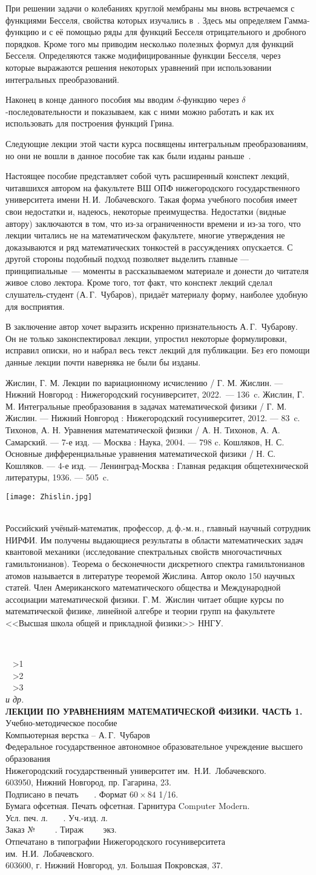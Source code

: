 \documentclass[10pt,a5paper,openany]{book}
\theoremstyle{definition}
\newcommand{\aboutauthor}{\newpage
	\thispagestyle{empty}
	\noindent\parbox{0.29\textwidth}{\texttt{[image: Zhislin.jpg]}}\parbox{0.69\textwidth}{\MakeUppercase{\athFA~\athNA}\\ \footnotesize Российский учёный-математик, профессор, д.\,ф.-м.\,н., главный научный сотрудник НИРФИ. Им получены выдающиеся результаты в области математических задач квантовой механики (исследование спектральных свойств многочастичных гамильтонианов). Теорема о бесконечности дискретного спектра гамильтонианов атомов называется в литературе теоремой Жислина. Автор около 150 научных статей. Член Американского математического общества и Международной ассоциации математической физики. Г.\,М.~Жислин читает общие курсы по математической физике, линейной алгебре и теории групп на факультете <<Высшая школа общей и прикладной физики>> ННГУ.}}
\newcommand{\lastpage}{
	\clearpage
	\thispagestyle{empty}
	~
	\vfill
	\begin{center}
		\athNA~\textbf{\athFA}
		\ifnum\numAuths>1\\\athNB~\textbf{\athFB}\fi
		\ifnum\numAuths>2\\\athNC~\textbf{\athFC}\fi
		\ifnum\numAuths>3\\\textit{и др.}\fi
		\\[12pt]
		\textbf{\MakeUppercase{\setTitle}.}\\[12pt]
		\setKind \\[24pt]
		Компьютерная верстка -- А.\,Г.~Чубаров\\[12pt]
		Федеральное государственное автономное образовательное учреждение высшего образования\\
		Нижегородский государственный университет им.~Н.И.~Лобачевского.\\
		603950, Нижний Новгород, пр. Гагарина, 23.\\[12pt]		
		Подписано в печать \ \ \ . Формат $60\times84$ 1/16.\\
		Бумага офсетная. Печать офсетная. Гарнитура Computer Modern.\\
		Усл. печ. л. \ \ \ . Уч.-изд. л.\\
		Заказ № \ \ \ \ . Тираж \ \ \ \ экз.\\[12pt]
		Отпечатано в типографии Нижегородского госуниверситета
		им.~Н.И.~Лобачевского.\\
		603600, г. Нижний Новгород, ул. Большая Покровская, 37.
	\end{center}
}
\newcommand{\setTitle}{Лекции по уравнениям математической физики. Часть 1}
\newcommand{\numAuths}{1}
\newcommand{\setKind}{Учебно-методическое пособие}
\begin{document}
	При решении задачи о колебаниях круглой мембраны мы вновь встречаемся с функциями Бесселя, свойства которых изучались в~\cite{VI}. Здесь мы определяем Гамма-функцию и с её помощью ряды для функций Бесселя отрицательного и дробного порядков. Кроме того мы приводим несколько полезных формул для функций Бесселя. Определяются также модифицированные функции Бесселя, через которые выражаются решения некоторых уравнений при использовании интегральных преобразований.  
	
	Наконец в конце данного пособия мы вводим $\delta$-функцию через $\delta$-по\-следовательности и показываем, как с ними можно работать и как их использовать для построения функций Грина.
	
	Следующие лекции этой части курса посвящены интегральным преобразованиям, но они не вошли в данное пособие так как были изданы раньше~\cite{IP}.
	
	Настоящее пособие представляет собой чуть расширенный конспект лекций, читавшихся автором на факультете ВШ ОПФ нижегородского государственного университета имени Н.\,И.~Лобачевского. Такая форма учебного пособия имеет свои недостатки и, надеюсь, некоторые преимущества. Недостатки (видные автору) заключаются в том, что из-за ограниченности времени и из-за того, что лекции читались не на математическом факультете, многие утверждения не доказываются и ряд математических тонкостей в рассуждениях опускается. С другой стороны подобный подход позволяет выделить главные --- принципиальные~--- моменты в рассказываемом материале и донести до читателя живое слово лектора. Кроме того, тот факт, что конспект лекций сделал слушатель-студент (А.\,Г.~Чубаров), придаёт материалу форму, наиболее удобную для восприятия.
	
	В заключение автор хочет выразить искренно признательность А.\,Г.~Чубарову. Он не только законспектировал лекции, упростил некоторые формулировки, исправил описки, но и набрал весь текст лекций для публикации. Без его помощи данные лекции почти наверняка не были бы изданы.

	
	
	
	
	
	
	
	
	
	

\begin{thebibliography}{99}
	\label{bibliography}

	 Жислин, Г. М. Лекции по вариационному исчислению / Г. М. Жислин. --- Нижний Новгород : Нижегородский госуниверситет, 2022.~--- 136~c. 
	 Жислин, Г. М. Интегральные преобразования в задачах математической физики / Г. М. Жислин. --- Нижний Новгород : Нижегородский госуниверситет, 2012. --- 83~c.
	 Тихонов, А. Н. Уравнения математической физики / А. Н. Тихонов, А. А. Самарский. --- 7-е изд. --- Москва : Наука, 2004. --- 798 c.
	Кошляков, Н. С. Основные дифференциальные уравнения математической физики / Н. С. Кошляков. --- 4-е изд. --- Ленинград-Москва : Главная редакция общетехнической литературы, 1936. --- 505~c.
\end{thebibliography}
\aboutauthor
\lastpage
\end{document}
